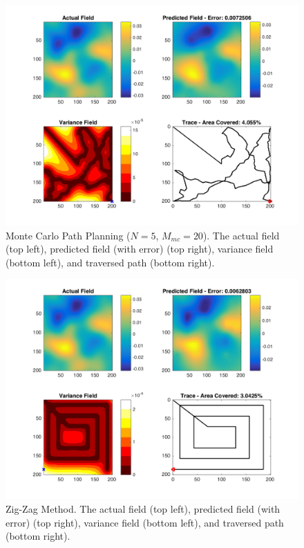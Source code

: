 \begin{figure}[htb!]
    \centering
    \includegraphics[width=0.8\linewidth]{figures/sim_figures/mc_3_5p_200x200_sf_20_seed_2}
    \captionsetup{skip=0.25\baselineskip}
    \ssp
    \caption{Monte Carlo Path Planning ($N=5$, $M_{mc}=20$). The actual field (top left), predicted field (with error) (top right), variance field (bottom left), and traversed path (bottom right).}
\end{figure}

\begin{figure}[htb!]
    \centering
    \includegraphics[width=0.8\linewidth]{figures/sim_figures/zz_3_5p_200x200_sf_20_seed_2}
    \captionsetup{skip=0.25\baselineskip}
    \ssp
    \caption{Zig-Zag Method. The actual field (top left), predicted field (with error) (top right), variance field (bottom left), and traversed path (bottom right).}
\end{figure}


